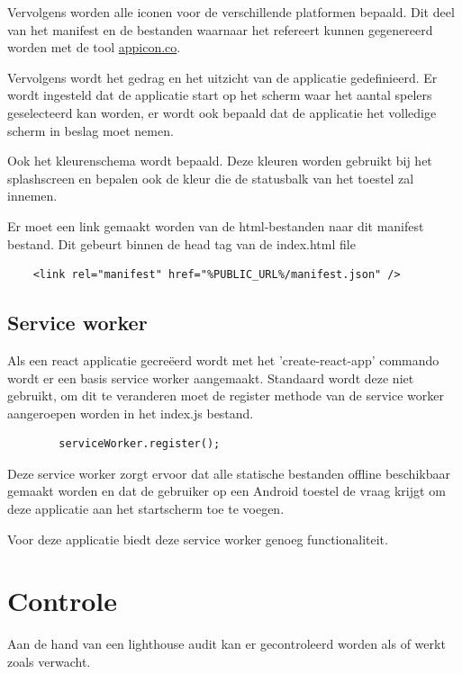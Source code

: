 		
		Vervolgens worden alle iconen voor de verschillende platformen bepaald. Dit deel van het manifest en de bestanden waarnaar het refereert kunnen gegenereerd worden met de tool \href{https://appicon.co}{appicon.co}.
		
		Vervolgens wordt het gedrag en het uitzicht van de applicatie gedefinieerd. Er wordt ingesteld dat de applicatie start op het scherm waar het aantal spelers geselecteerd kan worden, er wordt ook bepaald dat de applicatie het volledige scherm in beslag moet nemen.
		
		Ook het kleurenschema wordt bepaald. Deze kleuren worden gebruikt bij het splashscreen en bepalen ook de kleur die de statusbalk van het toestel zal innemen. 
		
		Er moet een link gemaakt worden van de html-bestanden naar dit manifest bestand. Dit gebeurt binnen de head tag van de index.html file
		
\begin{lstlisting}
	<link rel="manifest" href="%PUBLIC_URL%/manifest.json" />
\end{lstlisting}
		
		
	\subsection{Service worker}
		
		Als een react applicatie gecreëerd wordt met het 'create-react-app' commando wordt er  een basis service worker aangemaakt. Standaard wordt deze niet gebruikt, om dit te veranderen moet de register methode van de service worker aangeroepen worden in het index.js bestand.
		
\begin{lstlisting}
		serviceWorker.register();
\end{lstlisting}
		
		Deze service worker zorgt ervoor dat alle statische bestanden offline beschikbaar gemaakt worden en dat de gebruiker op een Android toestel de vraag krijgt om deze applicatie aan het startscherm toe te voegen.
		
		Voor deze applicatie biedt deze service worker genoeg functionaliteit.
		
\newpage
\section{Controle}

	Aan de hand van een lighthouse audit kan er gecontroleerd worden als of werkt zoals verwacht.
	
